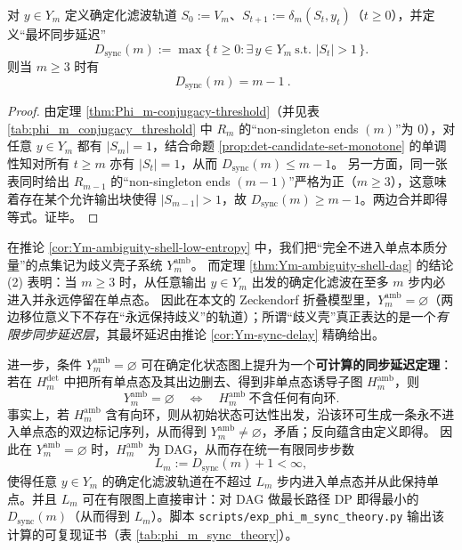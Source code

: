 \begin{corollary}[同步延迟的闭式与尖锐性]\label{cor:Ym-sync-delay}
对 $y\in Y_m$ 定义确定化滤波轨道 $S_0:=V_m$、$S_{t+1}:=\delta_m(S_t,y_t)$（$t\ge 0$），并定义“最坏同步延迟”
\[
D_{\mathrm{sync}}(m):=\max\{\,t\ge 0:\exists\,y\in Y_m\ \text{s.t. }|S_t|>1\,\}.
\]
则当 $m\ge 3$ 时有
\[
\boxed{\ D_{\mathrm{sync}}(m)=m-1\ }.
\]
\end{corollary}
\begin{proof}
由定理 \ref{thm:Phi_m-conjugacy-threshold}（并见表 \ref{tab:phi_m_conjugacy_threshold} 中 $R_m$ 的“non-singleton ends $(m)$”为 $0$），对任意 $y\in Y_m$ 都有 $|S_m|=1$，结合命题 \ref{prop:det-candidate-set-monotone} 的单调性知对所有 $t\ge m$ 亦有 $|S_t|=1$，从而 $D_{\mathrm{sync}}(m)\le m-1$。
另一方面，同一张表同时给出 $R_{m-1}$ 的“non-singleton ends $(m-1)$”严格为正（$m\ge 3$），这意味着存在某个允许输出块使得 $|S_{m-1}|>1$，故 $D_{\mathrm{sync}}(m)\ge m-1$。两边合并即得等式。证毕。
\end{proof}

\begin{remark}[歧义壳作为子系统在 \texorpdfstring{$m\ge 3$}{m>=3} 时为空]\label{rem:Ym-amb-empty}
在推论 \ref{cor:Ym-ambiguity-shell-low-entropy} 中，我们把“完全不进入单点本质分量”的点集记为歧义壳子系统 \(Y_m^{\mathrm{amb}}\)。
而定理 \ref{thm:Ym-ambiguity-shell-dag} 的结论 (2) 表明：当 \(m\ge 3\) 时，从任意输出 \(y\in Y_m\) 出发的确定化滤波在至多 \(m\) 步内必进入并永远停留在单点态。
因此在本文的 Zeckendorf 折叠模型里，\(Y_m^{\mathrm{amb}}=\varnothing\)（两边移位意义下不存在“永远保持歧义”的轨道）；所谓“歧义壳”真正表达的是一个\emph{有限步同步延迟层}，其最坏延迟由推论 \ref{cor:Ym-sync-delay} 精确给出。
\par
进一步，条件 \(Y_m^{\mathrm{amb}}=\varnothing\) 可在确定化状态图上提升为一个\textbf{可计算的同步延迟定理}：
若在 $H_m^{\mathrm{det}}$ 中把所有单点态及其出边删去、得到非单点态诱导子图 $H_m^{\mathrm{amb}}$，则
\[
Y_m^{\mathrm{amb}}=\varnothing
\quad\Longleftrightarrow\quad
H_m^{\mathrm{amb}}\ \text{不含任何有向环}.
\]
事实上，若 $H_m^{\mathrm{amb}}$ 含有向环，则从初始状态可达性出发，沿该环可生成一条永不进入单点态的双边标记序列，从而得到 \(Y_m^{\mathrm{amb}}\neq\varnothing\)，矛盾；反向蕴含由定义即得。
因此在 \(Y_m^{\mathrm{amb}}=\varnothing\) 时，$H_m^{\mathrm{amb}}$ 为 DAG，从而存在统一有限同步步数
\[
L_m:=D_{\mathrm{sync}}(m)+1<\infty,
\]
使得任意 \(y\in Y_m\) 的确定化滤波轨道在不超过 \(L_m\) 步内进入单点态并从此保持单点。并且 $L_m$ 可在有限图上直接审计：对 DAG 做最长路径 DP 即得最小的 \(D_{\mathrm{sync}}(m)\)（从而得到 \(L_m\)）。脚本 \texttt{scripts/exp\_phi\_m\_sync\_theory.py} 输出该计算的可复现证书（表 \ref{tab:phi_m_sync_theory}）。
\end{remark}

